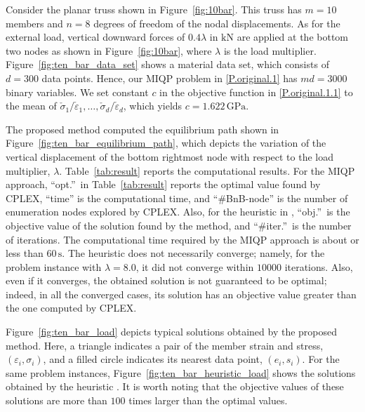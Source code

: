 \documentclass[a4paper,11pt]{scrartcl}
\theoremstyle{plain}
\theoremstyle{definition}
\theoremstyle{remark}
\newcommand{\reffig}[1]{Figure~\ref{#1}}
\newcommand{\reftab}[1]{Table~\ref{#1}}
\begin{document}
Consider the planar truss shown in \reffig{fig:10bar}. 
This truss has $m=10$ members and $n=8$ degrees of freedom 
of the nodal displacements. 
As for the external load, 
vertical downward forces of $0.4 \lambda$ in $\mathrm{kN}$ are applied at the bottom two nodes as shown in \reffig{fig:10bar}, 
where $\lambda$ is the load multiplier. 
\reffig{fig:ten_bar_data_set} shows a material data set, which 
consists of $d=300$ data points. 
Hence, our MIQP problem in \eqref{P.original.1} has $m d=3000$ binary variables. 
We set constant $c$ in the objective function in \eqref{P.original.1.1} 
to the mean of 
$\check{\sigma}_{1}/\check{\varepsilon}_{1},\dots,\check{\sigma}_{d}/\check{\varepsilon}_{d}$, 
which yields $c=1.622\,\mathrm{GPa}$. 

The proposed method computed the equilibrium path shown in 
\reffig{fig:ten_bar_equilibrium_path}, which depicts 
the variation of the vertical displacement of the bottom rightmost node 
with respect to the load multiplier, $\lambda$.  
\reftab{tab:result} reports the computational results. 
For the MIQP approach, 
``opt.''\ in \reftab{tab:result} reports the optimal value found by CPLEX, 
``time'' is the computational time, and 
``{\#}BnB-node'' is the number of enumeration nodes explored by CPLEX. 
Also, for the heuristic in \cite{KO16}, 
 ``obj.''\ is the objective value of the solution found by the method, and 
``{\#}iter.''\ is the number of iterations. 
The computational time required by the MIQP approach is about or less 
than $60\,\mathrm{s}$. 
The heuristic \cite{KO16} does not necessarily converge; namely, 
for the problem instance with $\lambda=8.0$, it did not converge within 
$10000$ iterations. 
Also, even if it converges, the obtained solution is not guaranteed to 
be optimal; indeed, in all the converged cases, its solution has 
an objective value greater than the one computed by CPLEX. 

\reffig{fig:ten_bar_load} depicts typical solutions obtained by the 
proposed method. 
Here, a triangle indicates a pair of the member strain and stress, 
$(\varepsilon_{i},\sigma_{i})$, 
and a filled circle indicates its nearest data point, 
$(e_{i},s_{i})$. 
For the same problem instances, \reffig{fig:ten_bar_heuristic_load} 
shows the solutions obtained by the heuristic \cite{KO16}. 
It is worth noting that the objective values of these solutions are more 
than $100$ times larger than the optimal values. 
\end{document}
